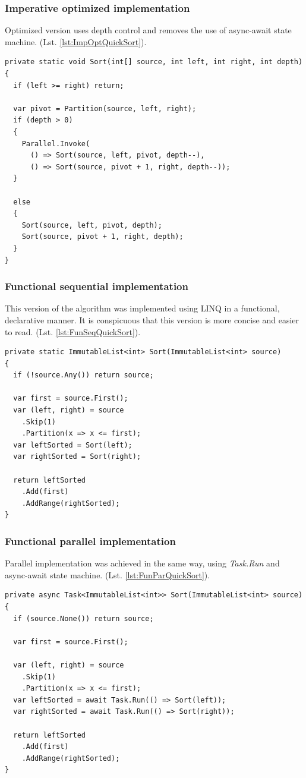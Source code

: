 \subsubsection{Imperative optimized implementation}
Optimized version uses depth control and removes the use of async-await state machine.
(Lst. \ref{lst:ImpOptQuickSort}).
\begin{lstlisting}[language={[sharp]c}, style=sharpcstyle, caption={Imperative optimized quicksort}, label={lst:ImpOptQuickSort}]
private static void Sort(int[] source, int left, int right, int depth)
{
  if (left >= right) return;

  var pivot = Partition(source, left, right);
  if (depth > 0)
  {
    Parallel.Invoke(
      () => Sort(source, left, pivot, depth--),
      () => Sort(source, pivot + 1, right, depth--));
  }

  else
  {
    Sort(source, left, pivot, depth);
    Sort(source, pivot + 1, right, depth);
  }
}
\end{lstlisting}

\subsubsection{Functional sequential implementation}
This version of the algorithm was implemented using LINQ in a functional, declarative manner. It is conspicuous that this version is more concise and easier to read. (Lst. \ref{lst:FunSeqQuickSort}).
\begin{lstlisting}[language={[sharp]c}, style=sharpcstyle, caption={Functional sequential quicksort implementation}, label={lst:FunSeqQuickSort}]
private static ImmutableList<int> Sort(ImmutableList<int> source)
{
  if (!source.Any()) return source;

  var first = source.First();
  var (left, right) = source
    .Skip(1)
    .Partition(x => x <= first);
  var leftSorted = Sort(left);
  var rightSorted = Sort(right);

  return leftSorted
    .Add(first)
    .AddRange(rightSorted);
}
\end{lstlisting}

\subsubsection{Functional parallel implementation}
Parallel implementation was achieved in the same way, using \emph{Task.Run} and async-await state machine. 
(Lst. \ref{lst:FunParQuickSort}).
\begin{lstlisting}[language={[sharp]c}, style=sharpcstyle, caption={Functional parallel quicksort}, label={lst:FunParQuickSort}]
private async Task<ImmutableList<int>> Sort(ImmutableList<int> source)
{
  if (source.None()) return source;

  var first = source.First();
  
  var (left, right) = source
    .Skip(1)
    .Partition(x => x <= first);
  var leftSorted = await Task.Run(() => Sort(left));
  var rightSorted = await Task.Run(() => Sort(right));

  return leftSorted
    .Add(first)
    .AddRange(rightSorted);
}
\end{lstlisting}

